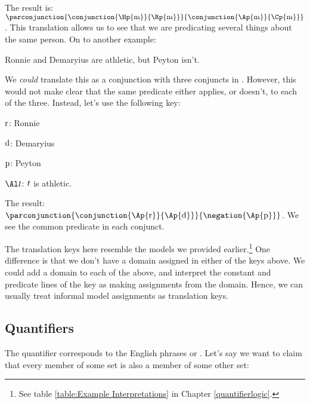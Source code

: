 \noindent{}The result is: $\parconjunction{\conjunction{\Hp{\constant{m}}}{\Rp{\constant{m}}}}{\conjunction{\Ap{\constant{m}}}{\Cp{\constant{m}}}}$.
This translation allows us to see that we are predicating several things about the same person.
On to another example:

\begin{menumerate}
	\item\label{GQLTrans2} Ronnie and Demaryius are athletic, but Peyton isn't.
\end{menumerate}

\noindent{}We \emph{could} translate this as a conjunction with three conjuncts in \GSL{}.
However, this would not make clear that the same predicate either applies, or doesn't, to each of the three.
Instead, let's use the following \GQL{} key:

\begin{description}[itemsep=0em]
	\item[Translation Key:] \hfill{} 
	\begin{description}[itemsep=0em]
		\item[] $\mathrm{r}$: Ronnie
		\item[] $\mathrm{d}$: Demaryius
		\item[] $\mathrm{p}$: Peyton
		\item[] $\Al\variable{t}$: $t$ is athletic.
	\end{description}
\end{description}

\noindent{}The result: $\parconjunction{\conjunction{\Ap{\constant{r}}}{\Ap{\constant{d}}}}{\negation{\Ap{\constant{p}}}}$.
We see the common predicate in each conjunct.

The translation keys here resemble the \GQL{} models we provided earlier.\footnote{
	See table \ref{table:Example Interpretations} in Chapter \ref{quantifierlogic}.
}
One difference is that we don't have a domain assigned in either of the \GQL{} keys above.
We could add a domain to each of the above, and interpret the constant and predicate lines of the key as making assignments from the domain.
Hence, we can usually treat informal model assignments as translation keys.

\subsection{Quantifiers}

The quantifier \mention{$\forall$} corresponds to the English phrases  or .
Let's say we want to claim that every member of some set is also a member of some other set:

